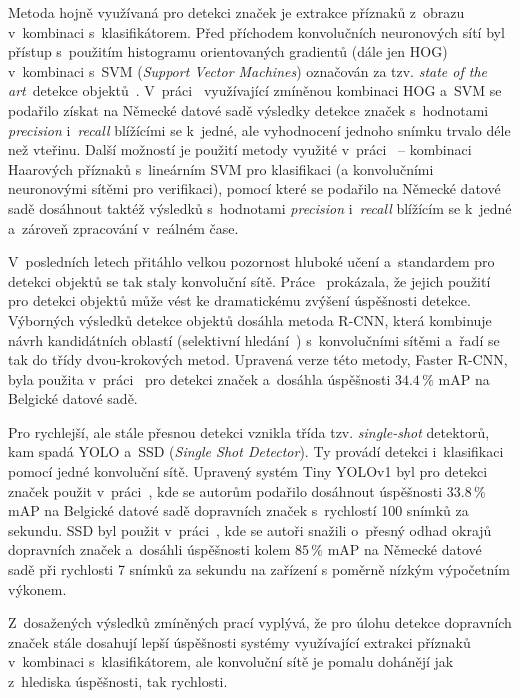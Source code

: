 Metoda hojně využívaná pro detekci značek je extrakce příznaků z~obrazu v~kombinaci s~klasifikátorem. Před příchodem konvolučních neuronových sítí byl přístup s~použitím histogramu orientovaných gradientů (dále jen HOG) v~kombinaci s~SVM (\emph{Support Vector Machines}) označován za tzv. \emph{state of the art}\footnotemark \, detekce objektů~\cite{tsdYolo}. V~práci~\cite{tsdHog} využívající zmíněnou kombinaci HOG a~SVM se podařilo získat na Německé datové sadě výsledky detekce značek s~hodnotami \emph{precision} i~\emph{recall} blížícími se k~jedné, ale vyhodnocení jednoho snímku trvalo déle než vteřinu. Další možností je použití metody využité v~práci~\cite{tsdHaar} -- kombinaci Haarových příznaků s~lineárním SVM pro klasifikaci (a konvolučními neuronovými sítěmi pro verifikaci), pomocí které se podařilo na Německé datové sadě dosáhnout taktéž výsledků s~hodnotami \emph{precision} i~\emph{recall} blížícím se k~jedné a~zároveň zpracování v~reálném čase.


V~posledních letech přitáhlo velkou pozornost hluboké učení a~standardem pro detekci objektů se tak staly konvoluční sítě. Práce~\cite{rcnn} prokázala, že jejich použití pro detekci objektů může vést ke dramatickému zvýšení úspěšnosti detekce. Výborných výsledků detekce objektů dosáhla metoda R-CNN, která kombinuje návrh kandidátních oblastí (selektivní hledání~\cite{selective-search}) s~konvolučními sítěmi a~řadí se tak do třídy dvou-krokových metod. Upravená verze této metody, Faster R-CNN, byla použita v~práci~\cite{tsdFastRcnn} pro detekci značek a~dosáhla úspěšnosti $34.4\,\%$ mAP na Belgické datové sadě.

Pro rychlejší, ale stále přesnou detekci vznikla třída tzv. \emph{single-shot} detektorů, kam spadá YOLO a~SSD (\emph{Single Shot Detector}). Ty provádí detekci i~klasifikaci pomocí jedné konvoluční sítě. Upravený systém Tiny YOLOv1 byl pro detekci značek použit v~práci~\cite{tsdYolo}, kde se autorům podařilo dosáhnout úspěšnosti $33.8\,\%$ mAP na Belgické datové sadě dopravních značek s~rychlostí 100 snímků za sekundu. SSD byl použit v~práci~\cite{tsdSsd}, kde se autoři snažili o~přesný odhad okrajů dopravních značek a~dosáhli úspěšnosti kolem $85\,\%$ mAP na Německé datové sadě při rychlosti 7 snímků za sekundu na zařízení s poměrně nízkým výpočetním výkonem.

Z~dosažených výsledků zmíněných prací vyplývá, že pro úlohu detekce dopravních značek stále dosahují lepší úspěšnosti systémy využívající extrakci příznaků v~kombinaci s~klasifikátorem, ale konvoluční sítě je pomalu dohánějí jak z~hlediska úspěšnosti, tak rychlosti.
